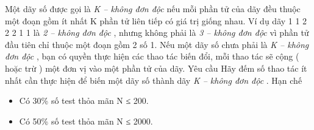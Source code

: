 Một dãy số được gọi là   \textit{    K – không đơn độc   }   nếu mỗi phần tử của dãy đều thuộc một đoạn gồm ít nhất       K      phần tử liên tiếp có giá trị giống nhau. Ví dụ dãy 1 1 2 2 2 1 1 là   \textit{    2 – không đơn độc   }   , nhưng không phải là   \textit{    3 – không đơn độc   }   vì phần tử đầu tiên chỉ thuộc một đoạn gồm 2 số 1. Nếu một dãy số chưa phải là   \textit{    K – không đơn độc   }   , bạn có quyền thực hiện các thao tác biến đổi, mỗi thao tác sẽ cộng ( hoặc trừ ) một đơn vị vào một phần tử của dãy.
   Yêu cầu  
Hãy đếm số thao tác ít nhất cần thực hiện để biến một dãy số thành dãy   \textit{    K – không đơn độc   }   .
   Hạn chế  
\begin{itemize}
	\item     Có 30\% số test thỏa mãn N ≤ 200.   
	\item     Có 50\% số test thỏa mãn N ≤ 2000.   
\end{itemize}